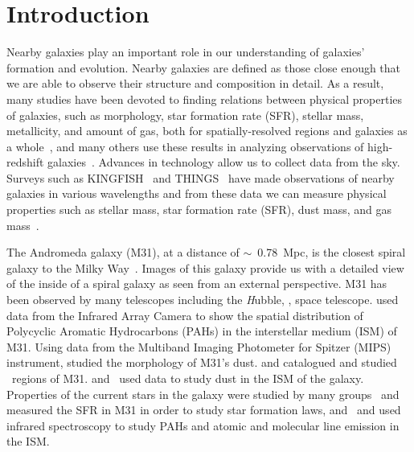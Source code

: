 \section{Introduction} 
Nearby galaxies play an important role in our understanding of galaxies' formation and evolution.
Nearby galaxies are defined as those close enough that we are able to observe their structure and composition in detail.
As a result, many studies have been devoted to finding relations between physical properties of galaxies, such as morphology, star formation rate (SFR), stellar mass, metallicity, and amount of gas, both for spatially-resolved regions and galaxies as a whole~\citep[e.g.][]{Wong13,Leroy08}, and many others use these results in analyzing observations of high-redshift galaxies~\citep[e.g.][]{Freundlich13,Walch11}.
Advances in technology allow us to collect data from the sky.
Surveys such as KINGFISH~\citep{Kennicutt11} and THINGS~\citep{Walter08} have made observations of nearby galaxies in various wavelengths and from these data we can measure physical properties such as stellar mass, star formation rate (SFR), dust mass, and gas mass~\citep[e.g.][]{Eskew12,Dale09,Calzetti07}.

The Andromeda galaxy (M31), at a distance of $\sim$~0.78~Mpc, is the closest spiral galaxy to the Milky Way~\citep{McConnachie05}.
Images of this galaxy provide us with a detailed view of the inside of a spiral galaxy as seen from an external perspective.
M31 has been observed by many telescopes including the {\textit Hubble}, \Spitzer, \Herschel space telescope.
\cite{Barmby06} used data from the \Spitzer Infrared Array Camera \citep[IRAC;][]{Fazio04} to show the spatial distribution of Polycyclic Aromatic Hydrocarbons (PAHs) in the interstellar medium (ISM) of M31.
Using data from the Multiband Imaging Photometer for Spitzer (MIPS) instrument, \cite{Gordon06} studied the morphology of M31's dust.
\cite{Azimlu11} and \cite{Sanders12} catalogued and studied \hii~regions of M31.
\cite{Draine14, Mattsson14, Viaene14, Smith12} and~\cite{Fritz12} used \Herschel data to study dust in the ISM of the galaxy.
Properties of the current stars in the galaxy were studied by many groups~\citep[e.g.][and references therein]{Tamm12,Dalcanton12,Massey07}
\cite{Rahmani16, Ford13} and \cite{Tabatabaei10} measured the SFR in M31 in order to study star formation laws, and~\cite{Dim15} and \cite{Kapala15} used infrared spectroscopy to study PAHs and atomic and molecular line emission in the ISM.

